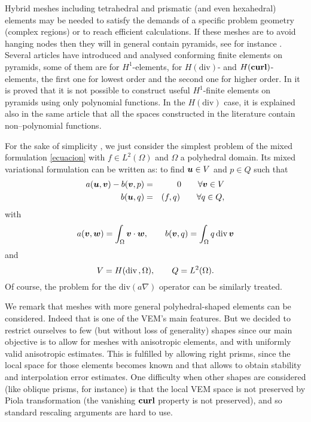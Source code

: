 Hybrid meshes including tetrahedral and prismatic (and even hexahedral) elements may be needed to satisfy the demands of a specific problem geometry (complex regions) or to reach efficient calculations. If these meshes are to avoid hanging nodes then they will in general contain pyramids, see for instance \cite{OS}. Several articles have introduced and analysed conforming finite elements on pyramids, some of them are \cite{BCD} for $H^1$-elements, \cite{GH, NP} for $H(\mbox{div})$- and $H({\bf curl})$-elements, the first one for lowest order and the second one for higher order. 
In \cite{NP} it is proved that it is not possible to construct useful $H^1$-finite elements on pyramids using only polynomial functions. In the $H(\mbox{div})$ case, it is explained also in the same article that all the spaces constructed in the literature contain non--polynomial functions.


For the sake of simplicity , we just consider the simplest problem of the mixed formulation \eqref{ecuacion}  with $f\in L^2(\Omega)$ and $\Omega$ a polyhedral domain. Its mixed variational formulation can be written as: to find $\boldsymbol{u}\in V$ and $p\in Q$ such that
\begin{eqnarray}\label{P}
a(\boldsymbol{u},\boldsymbol{v}) - b(\boldsymbol{v},p) & = & 0 \qquad \forall \boldsymbol{v}\in V\\ \nonumber b(\boldsymbol{u},q) &
= & (f,q)\qquad \forall q\in Q,  
\end{eqnarray}
with
\[
a(\boldsymbol{v},\boldsymbol{w})=\int_\Omega\boldsymbol{v}\cdot\boldsymbol{w},\qquad b(\boldsymbol{v},q)=\int_\Omega
q\,\mbox{div\,}\boldsymbol{v}
\]
and
\[
V=H(\mbox{div\,},\Omega), \qquad Q=L^2(\Omega).
\]
Of course, the problem for the $\mbox{div}(a\nabla)$ operator can be similarly treated. 


We remark that meshes with more general polyhedral-shaped elements can be considered. Indeed that is one of the VEM's main features. But we decided to restrict ourselves to few (but without loss of generality) shapes since our main objective is to allow for meshes with anisotropic elements, and with uniformly valid anisotropic estimates. This is fulfilled by allowing right prisms, since the local space for those elements becomes known \cite{N} and that allows to obtain stability and interpolation error estimates. One difficulty when other shapes are considered (like oblique prisms, for instance) is that the local VEM space is not preserved by Piola transformation (the vanishing ${\bf curl}$ property is not preserved), and so standard rescaling arguments are hard to use.  

